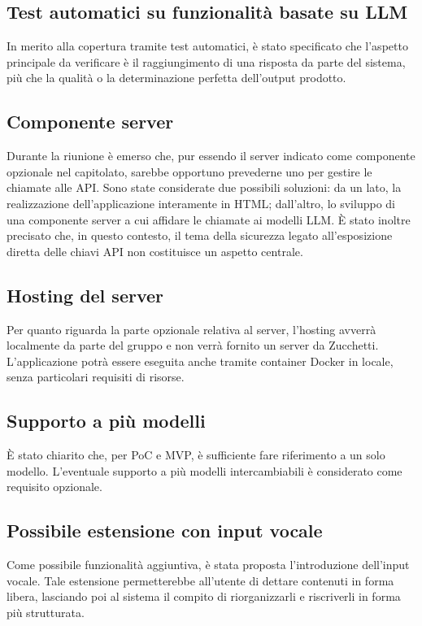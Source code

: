\documentclass[a4paper, 10pt, colorlinks=true, linkcolor=black, urlcolor=blue, citecolor=blue, hidelinks]{article}
\begin{document}
\subsection{Test automatici su funzionalità basate su LLM}
In merito alla copertura tramite test automatici, è stato specificato che l'aspetto principale da verificare è il raggiungimento di una risposta da parte del sistema, più che la qualità o la determinazione perfetta dell'output prodotto.

\subsection{Componente server}
Durante la riunione è emerso che, pur essendo il server indicato come componente opzionale nel capitolato, sarebbe opportuno prevederne uno per gestire le chiamate alle API. Sono state considerate due possibili soluzioni: da un lato, la realizzazione dell'applicazione interamente in HTML; dall'altro, lo sviluppo di una componente server a cui affidare le chiamate ai modelli LLM. È stato inoltre precisato che, in questo contesto, il tema della sicurezza legato all'esposizione diretta delle chiavi API non costituisce un aspetto centrale.

\subsection{Hosting del server}
Per quanto riguarda la parte opzionale relativa al server, l'hosting avverrà localmente da parte del gruppo e non verrà fornito un server da Zucchetti. L'applicazione potrà essere eseguita anche tramite container Docker in locale, senza particolari requisiti di risorse.

\subsection{Supporto a più modelli}
È stato chiarito che, per PoC e MVP, è sufficiente fare riferimento a un solo modello. L'eventuale supporto a più modelli intercambiabili è considerato come requisito opzionale.

\subsection{Possibile estensione con input vocale}
Come possibile funzionalità aggiuntiva, è stata proposta l'introduzione dell'input vocale. Tale estensione permetterebbe all'utente di dettare contenuti in forma libera, lasciando poi al sistema il compito di riorganizzarli e riscriverli in forma più strutturata.
\end{document}
